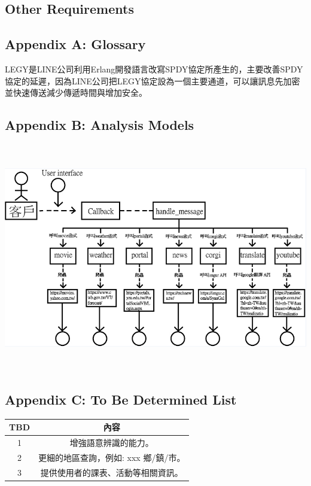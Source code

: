 \documentclass{scrreprt}
\begin{document}
\begin{CJK}{UTF8}{bkai}
\chapter{Other Requirements}

\section{Appendix A: Glossary}
LEGY是LINE公司利用Erlang開發語言改寫SPDY協定所產生的，主要改善SPDY協定的延遲，因為LINE公司把LEGY協定設為一個主要通道，可以讓訊息先加密並快速傳送減少傳遞時間與增加安全。

\section{Appendix B: Analysis Models}
\includegraphics[width=16cm,height=10cm]{flow.png}

\section{Appendix C: To Be Determined List}
\begin{center}
    \begin{tabular}{|c|c|}
        \hline
	    TBD & 內容\\
        \hline        
	    1 & 增強語意辨識的能力。\\
        \hline        
	    2 & 更細的地區查詢，例如: xxx 鄉/鎮/市。\\
        \hline
	    3 & 提供使用者的課表、活動等相關資訊。\\
        \hline
    \end{tabular}
\end{center}

\end{CJK}
\end{document}
